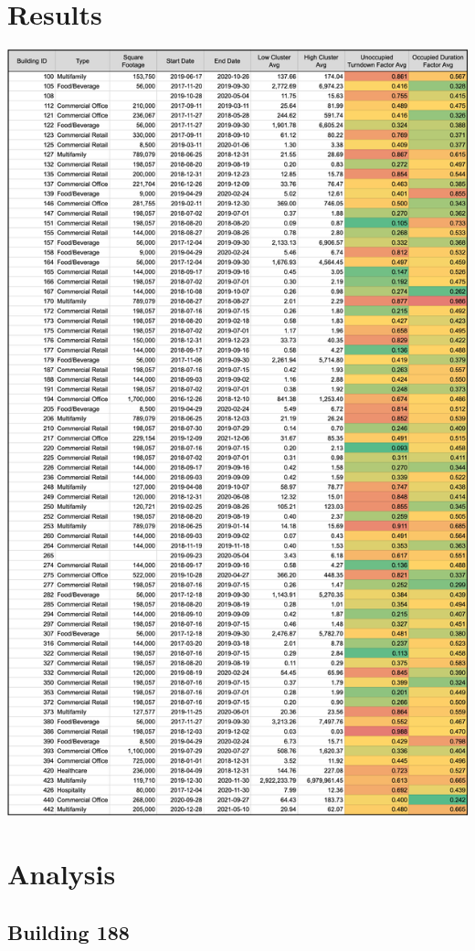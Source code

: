 \documentclass[a4paper]{article}
\begin{document}
\section{Results}

\includegraphics[width=\columnwidth]{./images/KPI_Result_Table.png}

\section{Analysis}

\subsection{Building 188}
\end{document}
